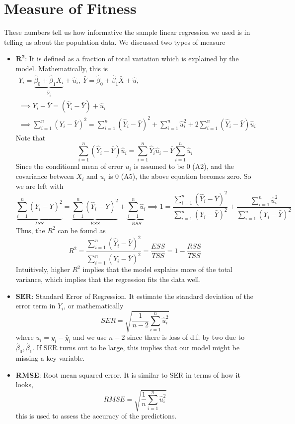 \section{Measure of Fitness}
These numbers tell us how informative the sample linear regression we used is in telling us about the population data. We discussed two types of measure
\begin{itemize}
\item $\mathbf{R^2}$: It is defined as a fraction of total variation which is explained by the model. Mathematically, this is
\begin{gather*}
Y_i = \underbrace{\hat{\beta}_0 + \hat{\beta}_1X_i}_{\hat{Y}_i} + \hat{u}_i, \ \bar{Y} = \hat{\beta}_0 + \hat{\beta}_1\bar{X} + \bar{\hat{u}}, \\
\implies Y_i-\bar{Y} = (\hat{Y}_i - \bar{Y}) + \hat{u}_i \\
\implies \sum_{i=1}^n (Y_i-\bar{Y})^2= \sum_{i=1}^n (\hat{Y}_i - \bar{Y})^2+\sum_{i=1}^n\hat{u}_i^2 + 2\sum_{i=1}^n(\hat{Y}_i - \bar{Y}) \hat{u}_i
\end{gather*}
Note that 
\[
\sum_{i=1}^n(\hat{Y}_i - \bar{Y}) \hat{u}_i=\sum_{i=1}^n\hat{Y}_i{\hat{u}}_i-\bar{Y}\sum_{i=1}^n\hat{u}_i 
\]
Since the conditional mean of error $u_i$ is assumed to be 0 (A2), and the covariance between $X_i$ and $u_i$ is 0 (A5), the above equation becomes zero. So we are left with
\[
\underbrace{\sum_{i=1}^n (Y_i-\bar{Y})^2}_{TSS}= \underbrace{\sum_{i=1}^n (\hat{Y}_i - \bar{Y})^2}_{ESS}+\underbrace{\sum_{i=1}^n\hat{u}_i}_{RSS} \implies 1=\frac{\sum_{i=1}^n (\hat{Y}_i - \bar{Y})^2}{\sum_{i=1}^n (Y_i-\bar{Y})^2} + \frac{\sum_{i=1}^n\hat{u}_i ^2 }{\sum_{i=1}^n (Y_i-\bar{Y})^2}
\]
Thus, the $R^2$ can be found as
\[
R^2 = \frac{\sum_{i=1}^n (\hat{Y}_i - \bar{Y})^2}{\sum_{i=1}^n (Y_i-\bar{Y})^2} = \frac{ESS}{TSS} = 1-\frac{RSS}{TSS}
\]
Intuitively, higher $R^2$ implies that the model explains more of the total variance, which implies that the regression fits the data well. 
\item $\mathbf{SER}$: Standard Error of Regression. It estimate the standard deviation of the error term in $Y_i$, or mathematically
\[
SER = \sqrt{\frac{1}{n-2}\sum_{i=1}^n \hat{u}_i^2}
\]
where $u_i = y_i-\hat{y}_i$ and we use $n-2$ since there is loss of d.f. by two due to $\hat{\beta}_0, \hat{\beta}_1$. If SER turns out to be large, this implies that our model might be missing a key variable.
 \item \textbf{RMSE}: Root mean squared error. It is similar to SER in terms of how it looks, 
\[
RMSE = \sqrt{\frac{1}{n}\sum_{i=1}^n \hat{u}_i^2}
\]
this is used to assess the accuracy of the predictions.
\end{itemize}



